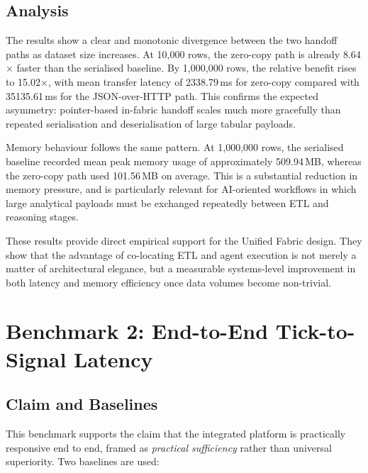 \documentclass[12pt, a4paper]{report}
\begin{document}
\subsection{Analysis}
\label{ssec:exp1_analysis}

The results show a clear and monotonic divergence between the two handoff paths as
dataset size increases. At 10,000 rows, the zero-copy path is already 8.64$\times$
faster than the serialised baseline. By 1,000,000 rows, the relative benefit rises to
15.02$\times$, with mean transfer latency of 2338.79\,ms for zero-copy compared with
35135.61\,ms for the JSON-over-HTTP path. This confirms the expected asymmetry:
pointer-based in-fabric handoff scales much more gracefully than repeated
serialisation and deserialisation of large tabular payloads.

Memory behaviour follows the same pattern. At 1,000,000 rows, the serialised baseline
recorded mean peak memory usage of approximately 509.94\,MB, whereas the zero-copy
path used 101.56\,MB on average. This is a substantial reduction in memory pressure,
and is particularly relevant for AI-oriented workflows in which large analytical
payloads must be exchanged repeatedly between ETL and reasoning stages.

These results provide direct empirical support for the Unified Fabric design. They
show that the advantage of co-locating ETL and agent execution is not merely a matter
of architectural elegance, but a measurable systems-level improvement in both latency
and memory efficiency once data volumes become non-trivial.

\section{Benchmark 2: End-to-End Tick-to-Signal Latency}
\label{sec:exp_e2e}

\subsection{Claim and Baselines}
\label{ssec:exp2_claim}

This benchmark supports the claim that the integrated platform is practically
responsive end to end, framed as \emph{practical sufficiency} rather than universal
superiority.
Two baselines are used:
\end{document}
